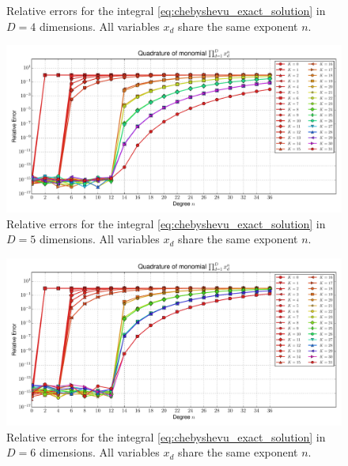 \documentclass[a4paper,10pt]{article}
\begin{document}
\begin{subfigures}
\begin{figure}
    \caption{Relative errors for the integral \eqref{eq:chebyshevu_exact_solution}
    in $D=4$ dimensions. All variables $x_d$ share the same exponent $n$.}
    \label{fig:monomial_errors_chebyshevu_multivariate_dimension_4}
  \end{figure}
  \begin{figure}\centering
    \includegraphics[width=\linewidth]{./img/monomial_errors_chebyshevu_multivariate_dimension_5.pdf}
    \caption{Relative errors for the integral \eqref{eq:chebyshevu_exact_solution}
    in $D=5$ dimensions. All variables $x_d$ share the same exponent $n$.}
    \label{fig:monomial_errors_chebyshevu_multivariate_dimension_5}
  \end{figure}
  \begin{figure}\centering
    \includegraphics[width=\linewidth]{./img/monomial_errors_chebyshevu_multivariate_dimension_6.pdf}
    \caption{Relative errors for the integral \eqref{eq:chebyshevu_exact_solution}
    in $D=6$ dimensions. All variables $x_d$ share the same exponent $n$.}
    \label{fig:monomial_errors_chebyshevu_multivariate_dimension_6}
  \end{figure}
  \label{fig:monomial_errors_chebyshevu_multivariate}
\end{subfigures}
\end{document}
